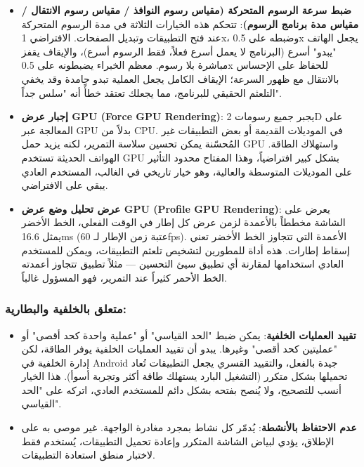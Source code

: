 \begin{itemize}
  \item \textbf{ضبط سرعة الرسوم المتحركة (مقياس رسوم النوافذ / مقياس رسوم الانتقال / مقياس مدة برنامج الرسوم)}: تتحكم هذه الخيارات الثلاثة في مدة الرسوم المتحركة عند فتح التطبيقات وتبديل الصفحات. الافتراضي 1x، وضبطه على 0.5x يجعل الهاتف "يبدو" أسرع (البرنامج لا يعمل أسرع فعلاً، فقط الرسوم أسرع)، والإيقاف يقفز مباشرة بلا رسوم. معظم الخبراء يضبطونه على 0.5x للحفاظ على الإحساس بالانتقال مع ظهور السرعة؛ الإيقاف الكامل يجعل العملية تبدو جامدة وقد يخفي التلعثم الحقيقي للبرنامج، مما يجعلك تعتقد خطأً أنه "سلس جداً".
  \item \textbf{إجبار عرض GPU (Force GPU Rendering)}: يجبر جميع رسومات 2D على المعالجة عبر GPU بدلاً من CPU. في الموديلات القديمة أو بعض التطبيقات غير المُحسّنة يمكن تحسين سلاسة التمرير، لكنه يزيد حمل GPU واستهلاك الطاقة. الهواتف الحديثة تستخدم GPU بشكل كبير افتراضياً، وهذا المفتاح محدود التأثير على الموديلات المتوسطة والعالية، وهو خيار تاريخي في الغالب، المستخدم العادي يبقي على الافتراضي.
  \item \textbf{عرض تحليل وضع عرض GPU (Profile GPU Rendering)}: يعرض على الشاشة مخططاً بالأعمدة لزمن عرض كل إطار في الوقت الفعلي، الخط الأخضر يمثل 16.6ms (عتبة زمن الإطار لـ 60fps). الأعمدة التي تتجاوز الخط الأخضر تعني إسقاط إطارات. هذه أداة للمطورين لتشخيص تلعثم التطبيقات، ويمكن للمستخدم العادي استخدامها لمقارنة أي تطبيق سيئ التحسين — مثلاً تطبيق تتجاوز أعمدته الخط الأحمر كثيراً عند التمرير، فهو المسؤول غالباً.
\end{itemize}

\subsubsection*{متعلق بالخلفية والبطارية:}

\begin{itemize}
  \item \textbf{تقييد العمليات الخلفية}: يمكن ضبط "الحد القياسي" أو "عملية واحدة كحد أقصى" أو "عمليتين كحد أقصى" وغيرها. يبدو أن تقييد العمليات الخلفية يوفر الطاقة، لكن إدارة الخلفية في Android جيدة بالفعل، والتقييد القسري يجعل التطبيقات تُعاد تحميلها بشكل متكرر (التشغيل البارد يستهلك طاقة أكثر وتجربة أسوأ). هذا الخيار أنسب للتصحيح، ولا يُنصح بفتحه بشكل دائم للمستخدم العادي، اتركه على "الحد القياسي".
  \item \textbf{عدم الاحتفاظ بالأنشطة}: يُدمّر كل نشاط بمجرد مغادرة الواجهة. غير موصى به على الإطلاق، يؤدي لبياض الشاشة المتكرر وإعادة تحميل التطبيقات، يُستخدم فقط لاختبار منطق استعادة التطبيقات.
\end{itemize}


